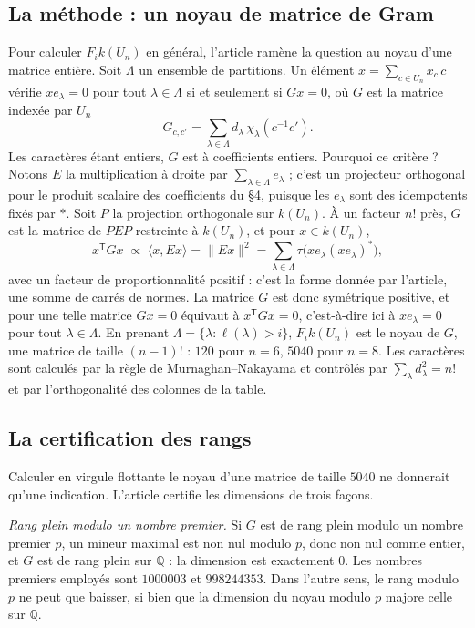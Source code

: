 \documentclass[11pt,a4paper]{amsart}
\theoremstyle{definition}
\theoremstyle{plain}
\theoremstyle{remark}
\newcommand{\Q}{\mathbb Q}
\begin{document}
\subsection{La méthode : un noyau de matrice de Gram}

Pour calculer $F_i k(U_n)$ en général, l'article ramène la question au noyau d'une matrice entière. Soit $\Lambda$ un ensemble de partitions. Un élément $x = \sum_{c \in U_n} x_c\, c$ vérifie $x e_\lambda = 0$ pour tout $\lambda \in \Lambda$ si et seulement si $Gx = 0$, où $G$ est la matrice indexée par $U_n$
\[
G_{c, c'} = \sum_{\lambda \in \Lambda} d_\lambda\, \chi_\lambda(c^{-1}c') .
\]
Les caractères étant entiers, $G$ est à coefficients entiers. Pourquoi ce critère ? Notons $E$ la multiplication à droite par $\sum_{\lambda \in \Lambda} e_\lambda$ ; c'est un projecteur orthogonal pour le produit scalaire des coefficients du \S4, puisque les $e_\lambda$ sont des idempotents fixés par $*$. Soit $P$ la projection orthogonale sur $k(U_n)$. À un facteur $n!$ près, $G$ est la matrice de $P E P$ restreinte à $k(U_n)$, et pour $x \in k(U_n)$,
\[
x^{\mathsf T} G x \;\propto\; \langle x, E x \rangle = \| E x \|^2 = \sum_{\lambda \in \Lambda} \tau\bigl(x e_\lambda (x e_\lambda)^*\bigr),
\]
avec un facteur de proportionnalité positif : c'est la forme donnée par l'article, une somme de carrés de normes. La matrice $G$ est donc symétrique positive, et pour une telle matrice $Gx = 0$ équivaut à $x^{\mathsf T} G x = 0$, c'est-à-dire ici à $x e_\lambda = 0$ pour tout $\lambda \in \Lambda$. En prenant $\Lambda = \{\lambda : \ell(\lambda) > i\}$, $F_i k(U_n)$ est le noyau de $G$, une matrice de taille $(n-1)!$ : $120$ pour $n = 6$, $5040$ pour $n = 8$. Les caractères sont calculés par la règle de Murnaghan--Nakayama et contrôlés par $\sum_\lambda d_\lambda^2 = n!$ et par l'orthogonalité des colonnes de la table.

\subsection{La certification des rangs}

Calculer en virgule flottante le noyau d'une matrice de taille $5040$ ne donnerait qu'une indication. L'article certifie les dimensions de trois façons.

\emph{Rang plein modulo un nombre premier.} Si $G$ est de rang plein modulo un nombre premier $p$, un mineur maximal est non nul modulo $p$, donc non nul comme entier, et $G$ est de rang plein sur $\Q$ : la dimension est exactement $0$. Les nombres premiers employés sont $1000003$ et $998244353$. Dans l'autre sens, le rang modulo $p$ ne peut que baisser, si bien que la dimension du noyau modulo $p$ majore celle sur $\Q$.
\end{document}
